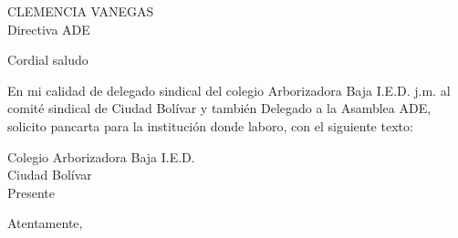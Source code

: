 \documentclass[letterpaper,spanish,11pt]{letter}
\date{16 de marzo de 2015}
\begin{document}
\begin{letter}{CLEMENCIA VANEGAS\\Directiva ADE}
	
\opening{Cordial saludo}
En mi calidad de delegado sindical del colegio Arborizadora Baja  I.E.D. j.m. al comité sindical de Ciudad Bolívar y también Delegado a la Asamblea ADE, solicito pancarta para la institución donde laboro, con el siguiente texto:\\

\begin{center}
Colegio Arborizadora Baja I.E.D.\\
Ciudad Bolívar\\
Presente\\
\end{center}
\closing{Atentamente,}


\end{letter}
\end{document}
